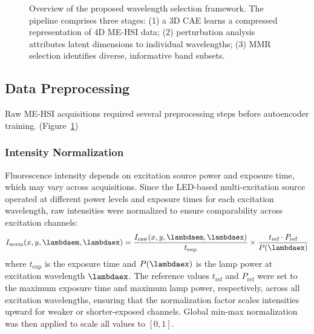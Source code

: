\begin{figure}[!t]
\caption{Overview of the proposed wavelength selection framework. The pipeline comprises three stages: (1) a 3D CAE learns a compressed representation of 4D ME-HSI data; (2) perturbation analysis attributes latent dimensions to individual wavelengths; (3) MMR selection identifies diverse, informative band subsets.}
\label{fig:pipeline}
\end{figure}

\subsection{Data Preprocessing}
\label{sec:preprocessing}

Raw ME-HSI acquisitions required several preprocessing steps before autoencoder training. (Figure~\ref{fig:pipeline})

\subsubsection{Intensity Normalization}
Fluorescence intensity depends on excitation source power and exposure time, which may vary across acquisitions.
Since the LED-based multi-excitation source operated at different power levels and exposure times for each excitation wavelength, raw intensities were normalized to ensure comparability across excitation channels:
\begin{equation}
I_{\text{norm}}(x, y, \lambdaem, \lambdaex) = \frac{I_{\text{raw}}(x, y, \lambdaem, \lambdaex)}{t_{\text{exp}}} \times \frac{t_{\text{ref}} \cdot P_{\text{ref}}}{P(\lambdaex)}
\label{eq:normalization}
\end{equation}
where $t_{\text{exp}}$ is the exposure time and $P(\lambdaex)$ is the lamp power at excitation wavelength $\lambdaex$.
The reference values $t_{\text{ref}}$ and $P_{\text{ref}}$ were set to the maximum exposure time and maximum lamp power, respectively, across all excitation wavelengths, ensuring that the normalization factor scales intensities upward for weaker or shorter-exposed channels.
Global min-max normalization was then applied to scale all values to $[0, 1]$.

